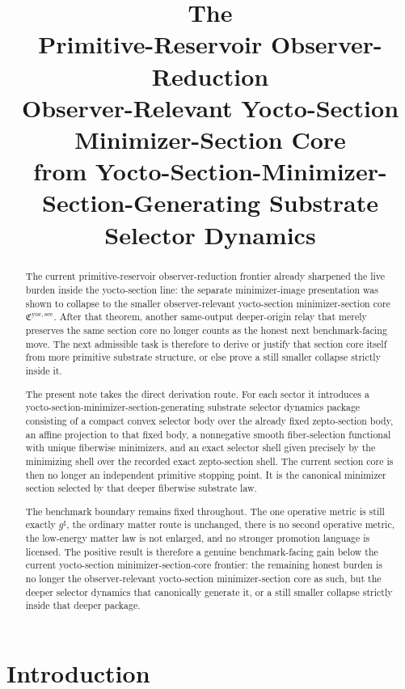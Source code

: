 \documentclass[11pt]{article}
\title{\textbf{The \TheoryName{}}\\[0.4em]
\large Primitive-Reservoir Observer-Reduction\\
\large Observer-Relevant Yocto-Section Minimizer-Section Core\\
\large from Yocto-Section-Minimizer-Section-Generating Substrate Selector Dynamics}
\author{}
\date{}
\newcommand{\CompletedMetric}{g^{\sharp}}
\newcommand{\YoctoMinSectionCore}{\mathfrak C^{\mathrm{yoc,sec}}}
\begin{document}
\maketitle

\begin{abstract}
The current primitive-reservoir observer-reduction frontier already sharpened the live burden inside the yocto-section line: the separate minimizer-image presentation was shown to collapse to the smaller observer-relevant yocto-section minimizer-section core \(\YoctoMinSectionCore\). After that theorem, another same-output deeper-origin relay that merely preserves the same section core no longer counts as the honest next benchmark-facing move. The next admissible task is therefore to derive or justify that section core itself from more primitive substrate structure, or else prove a still smaller collapse strictly inside it.

The present note takes the direct derivation route. For each sector it introduces a yocto-section-minimizer-section-generating substrate selector dynamics package consisting of a compact convex selector body over the already fixed zepto-section body, an affine projection to that fixed body, a nonnegative smooth fiber-selection functional with unique fiberwise minimizers, and an exact selector shell given precisely by the minimizing shell over the recorded exact zepto-section shell. The current section core is then no longer an independent primitive stopping point. It is the canonical minimizer section selected by that deeper fiberwise substrate law.

The benchmark boundary remains fixed throughout. The one operative metric is still exactly \(\CompletedMetric\), the ordinary matter route is unchanged, there is no second operative metric, the low-energy matter law is not enlarged, and no stronger promotion language is licensed. The positive result is therefore a genuine benchmark-facing gain below the current yocto-section minimizer-section-core frontier: the remaining honest burden is no longer the observer-relevant yocto-section minimizer-section core as such, but the deeper selector dynamics that canonically generate it, or a still smaller collapse strictly inside that deeper package.
\end{abstract}

\section{Introduction}
\end{document}
